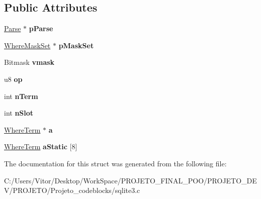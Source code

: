\subsection*{Public Attributes}
\begin{DoxyCompactItemize}
\item 
\hypertarget{struct_where_clause_a3ff6dfc93e7b9b97a9bf9a0618a1d542}{\hyperlink{struct_parse}{Parse} $\ast$ {\bfseries p\-Parse}}\label{struct_where_clause_a3ff6dfc93e7b9b97a9bf9a0618a1d542}

\item 
\hypertarget{struct_where_clause_ae308a1600721b7dfa0855136926a5554}{\hyperlink{struct_where_mask_set}{Where\-Mask\-Set} $\ast$ {\bfseries p\-Mask\-Set}}\label{struct_where_clause_ae308a1600721b7dfa0855136926a5554}

\item 
\hypertarget{struct_where_clause_aaef3dd42bb6c23890d8ad8824e2a00ee}{Bitmask {\bfseries vmask}}\label{struct_where_clause_aaef3dd42bb6c23890d8ad8824e2a00ee}

\item 
\hypertarget{struct_where_clause_a7a56a5fe1ab6603e930f3b5372ff2f71}{u8 {\bfseries op}}\label{struct_where_clause_a7a56a5fe1ab6603e930f3b5372ff2f71}

\item 
\hypertarget{struct_where_clause_ab84924c3c78af1ab387ab3919c5031c4}{int {\bfseries n\-Term}}\label{struct_where_clause_ab84924c3c78af1ab387ab3919c5031c4}

\item 
\hypertarget{struct_where_clause_ac92b93d65d4c3d9216707a049a4edb1c}{int {\bfseries n\-Slot}}\label{struct_where_clause_ac92b93d65d4c3d9216707a049a4edb1c}

\item 
\hypertarget{struct_where_clause_a140d726a3e20ac7b6853d539c59add72}{\hyperlink{struct_where_term}{Where\-Term} $\ast$ {\bfseries a}}\label{struct_where_clause_a140d726a3e20ac7b6853d539c59add72}

\item 
\hypertarget{struct_where_clause_a4acb8640bc9f42752900de5735bcd8e0}{\hyperlink{struct_where_term}{Where\-Term} {\bfseries a\-Static} \mbox{[}8\mbox{]}}\label{struct_where_clause_a4acb8640bc9f42752900de5735bcd8e0}

\end{DoxyCompactItemize}


The documentation for this struct was generated from the following file\-:\begin{DoxyCompactItemize}
\item 
C\-:/\-Users/\-Vitor/\-Desktop/\-Work\-Space/\-P\-R\-O\-J\-E\-T\-O\-\_\-\-F\-I\-N\-A\-L\-\_\-\-P\-O\-O/\-P\-R\-O\-J\-E\-T\-O\-\_\-\-D\-E\-V/\-P\-R\-O\-J\-E\-T\-O/\-Projeto\-\_\-codeblocks/sqlite3.\-c\end{DoxyCompactItemize}
